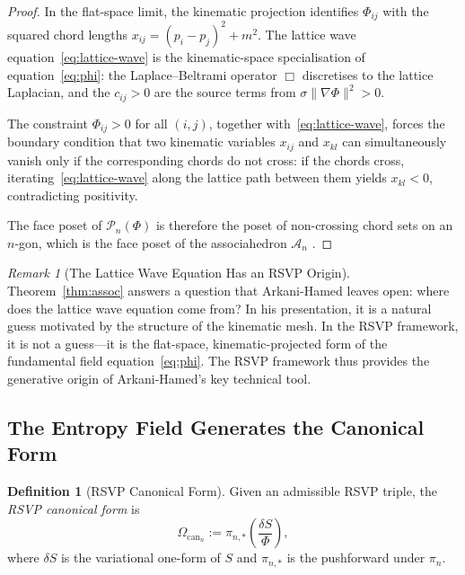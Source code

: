 \documentclass[12pt, oneside]{amsart}
\theoremstyle{plain}
\theoremstyle{definition}
\newtheorem{definition}[theorem]{Definition}
\theoremstyle{remark}
\newtheorem{remark}[theorem]{Remark}
\newcommand{\Phif}{\Phi}   %
\newcommand{\Sf}{S}         %
\newcommand{\Assoc}{\mathcal{A}_n}
\newcommand{\CF}{\Omega_{\mathrm{can}}}
\begin{document}
\begin{proof}
In the flat-space limit, the kinematic projection identifies $\Phif_{ij}$ with the squared chord lengths $x_{ij} = (p_i - p_j)^2 + m^2$. The lattice wave equation~\eqref{eq:lattice-wave} is the kinematic-space specialisation of equation~\eqref{eq:phi}: the Laplace--Beltrami operator $\Box$ discretises to the lattice Laplacian, and the $c_{ij} > 0$ are the source terms from $\sigma\|\nabla\Phif\|^2 > 0$.

The constraint $\Phif_{ij} > 0$ for all $(i,j)$, together with~\eqref{eq:lattice-wave}, forces the boundary condition that two kinematic variables $x_{ij}$ and $x_{kl}$ can simultaneously vanish only if the corresponding chords do not cross: if the chords cross, iterating~\eqref{eq:lattice-wave} along the lattice path between them yields $x_{kl} < 0$, contradicting positivity.

The face poset of $\mathcal{P}_n(\Phif)$ is therefore the poset of non-crossing chord sets on an $n$-gon, which is the face poset of the associahedron $\Assoc$ \cite{Stasheff1963, Loday2004}.
\end{proof}

\begin{remark}[The Lattice Wave Equation Has an RSVP Origin]
Theorem~\ref{thm:assoc} answers a question that Arkani-Hamed leaves open: where does the lattice wave equation come from? In his presentation, it is a natural guess motivated by the structure of the kinematic mesh. In the RSVP framework, it is not a guess---it is the flat-space, kinematic-projected form of the fundamental field equation~\eqref{eq:phi}. The RSVP framework thus provides the generative origin of Arkani-Hamed's key technical tool.
\end{remark}

\subsection{The Entropy Field Generates the Canonical Form}

\begin{definition}[RSVP Canonical Form]
Given an admissible RSVP triple, the \emph{RSVP canonical form} is
\begin{equation}
\label{eq:rsvp-cf}
  \CF_n := \pi_{n,*}\!\left(\frac{\delta \Sf}{\Phif}\right),
\end{equation}
where $\delta \Sf$ is the variational one-form of $\Sf$ and $\pi_{n,*}$ is the pushforward under $\pi_n$.
\end{definition}
\end{document}
